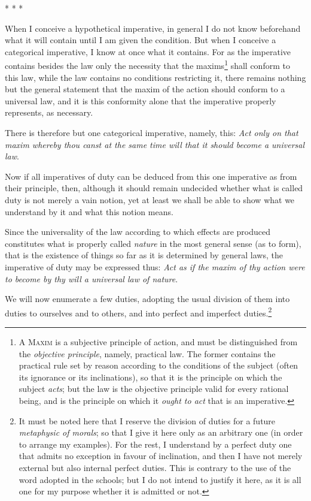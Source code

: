 \begin{center}* * *\end{center}

When I conceive a hypothetical imperative, in general I do
not know beforehand what it will contain until I am given the
condition. But when I conceive a categorical imperative, I know at
once what it contains. For as the imperative contains besides the law
only the necessity that the maxims\footnote{A \textsc{Maxim} is a
subjective principle of action, and must be distinguished from the
\textit{objective principle}, namely, practical law. The former
contains the practical rule set by reason according to the conditions
of the subject (often its ignorance or its inclinations), so that it
is the principle on which the subject \textit{acts}; but the law is
the objective principle valid for every rational being, and is the
principle on which it \textit{ought to act} that is an imperative.}
shall conform to this law, while the law contains no conditions
restricting it, there remains nothing but the general statement that
the maxim of the action should conform to a universal law, and it is
this conformity alone that the imperative properly represents, as
necessary.

There is therefore but one categorical imperative, namely, this:
\textit{Act only on that maxim whereby thou canst at the same time
will that it should become a universal law}.

Now if all imperatives of duty can be deduced from this one imperative
as from their principle, then, although it should remain undecided
whether what is called duty is not merely a  vain notion, yet
at least we shall be able to show what we understand by it and what
this notion means.

Since the universality of the law according to which effects are
produced constitutes what is properly called \textit{nature} in the
most general sense (as to form), that is the existence of things so
far as it is determined by general laws, the imperative of duty may be
expressed thus: \textit{Act as if the maxim of thy action were to
become by thy will a universal law of nature}.

We will now enumerate a few duties, adopting the usual division of
them into duties to ourselves and to others, and into perfect and
imperfect duties.\footnote{It must be noted here that I reserve the
division of duties for a future \textit{metaphysic of morals}; so that
I give it here only as an arbitrary one (in order to arrange my
examples). For the rest, I understand by a perfect duty one that
admits no exception in favour of inclination, and then I have not
merely external but also internal perfect duties. This is contrary to
the use of the word adopted in the schools; but I do not intend to
justify it here, as it is all one for my purpose whether it is
admitted or not.}

